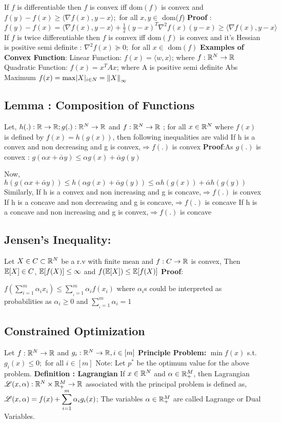 \documentclass[a4paper,english,12pt]{article}
\begin{document}
{If $f$ is differentiable then $f$ is convex iff dom$(f)$ is convex and  $f(y) -f(x) \geq \langle\nabla f(x), y-x\rangle; $ for all $ x,y \in$ dom($f$)
\textbf{Proof} : $ f(y) - f(x) = \langle\nabla f(x) , y-x\rangle + \frac{1}{2}(y-x)^T \nabla^2 f(x) (y-x) \geq \langle\nabla f(x) , y-x\rangle$
If $f$ is twice differentiable then $f$ is convex iff dom$(f)$ is convex and it's Hessian is positive semi definite : $\nabla^2 f(x)\succeq 0; $ for all $ x \in$ dom$(f)$
\textbf{Examples of Convex Function}:
Linear Function:  $f(x) = \langle w,x\rangle$; where $f:\mathbb{R}^N\to\mathbb{R}$
Quadratic Function: $f(x) = x^TAx$; where A is positive semi definite 
Abs Maximum $f(x) = \max \lvert X\rvert_{i \in N} = \left\lVert X\right\rVert_\infty$
\subsection{Lemma : Composition of Functions} 
Let, $h(.):\mathbb{R}\to\mathbb{R};g(.):\mathbb{R}^N\to\mathbb{R}$ and $f:\mathbb{R}^N\to\mathbb{R}$ ;  for all $ x \in \mathbb{R}^N$ where $f(x)$ is defined by $f(x) = h(g(x))$, then following inequalities are valid
If h is a convex and non decreasing and g is convex,$\Longrightarrow f(.)$ is convex
\textbf{Proof}:As $g(.)$ is convex :  $g(\alpha x + \bar{\alpha}y )\leq \alpha g(x) + \bar{\alpha} g(y)$ 

Now, $h(g(\alpha x + \bar{\alpha}y ))\leq h(\alpha g(x) + \bar{\alpha} g(y))\leq \alpha h(g(x)) + \bar{\alpha} h(g(y))$
Similarly,
If h is a convex and non increasing and g is concave,$\Longrightarrow f(.)$ is convex
If h is a concave and non decreasing and g is concave,$\Longrightarrow f(.)$ is concave
If h is a concave and non increasing and g is convex,$\Longrightarrow f(.)$ is concave

\subsection{Jensen's Inequality:} 
Let $X\in C \subset \mathbb{R}^N$ be a r.v with finite mean and $f:C\to \mathbb{R}$ is convex,
Then $\mathbb{E}[X] \in C$,   $\mathbb{E}[f(X)]\leq \infty$ and $f(\mathbb{E}[X]) \leq \mathbb{E}[f(X)]$
\textbf{Proof}: {$f(\displaystyle{\sum_{i=1}^{m}\alpha_{i}x_{i}}) \leq \sum_{_i=1}^{m}\alpha_{i}f(x_{i})$ where $\alpha_{i}$s could be interpreted as probabilities as $\alpha_{i}\geq0$ and $\displaystyle{\sum_{_i=1}^{m}\alpha_{i}}=1$
	
\subsection{Constrained Optimization}
Let $f:\mathbb{R}^N\to\mathbb{R}$ and $g_{i}:\mathbb{R}^N\to\mathbb{R}, i \in [m]$ 
\textbf{Principle Problem:} $\min f(x)$ s.t. $g_{i}(x)\leq 0;$ for all $ i \in [m]$
Note: Let $p^*$ be the optimum value for the above problem.
 \textbf{Definition : Lagrangian}
If $x \in \mathbb{R}^N$ and $\alpha \in \mathbb{R}_+^M$, then Lagrangian $\mathscr{L}(x,\alpha):\mathbb{R}^N\times\mathbb{R}_+^M\to\mathbb{R}$ associated with the principal problem is defined as,   $\mathscr{L}(x,\alpha) = f(x) + \displaystyle{\sum_{i=1}^{m}\alpha_i g_i(x)}$;
The variables $\alpha \in \mathbb{R}_+^M$ are called Lagrange or Dual Variables.
}}
\end{document}
